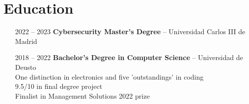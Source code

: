 \section*{Education}
\begin{itemize}
    \item[2022 -- 2023] \textbf{Cybersecurity Master's Degree} -- Universidad Carlos III de Madrid
    \item[2018 -- 2022] \textbf{Bachelor's Degree in Computer Science} -- Universidad de Deusto\\
    One distinction in electronics and five 'outstandings' in coding\\
    9.5/10 in final degree project\\
    Finalist in Management Solutions 2022 prize
\end{itemize}

